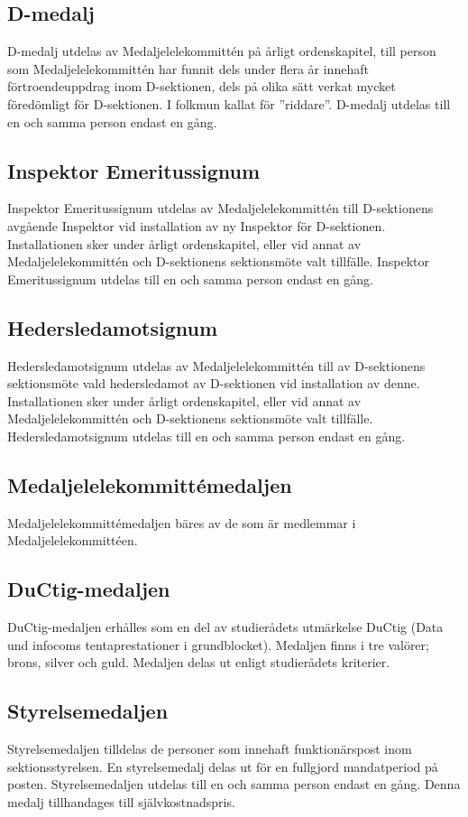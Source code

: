 \documentclass[pdfbookmarks,a4paper,11pt]{article}
\begin{document}
\subsection{D-medalj}
D-medalj utdelas av Medaljelelekommittén på årligt ordenskapitel, till person som Medaljelelekommittén har funnit dels under flera år innehaft förtroendeuppdrag inom D-sektionen, dels på olika sätt verkat mycket föredömligt för D-sektionen. I folkmun kallat för ''riddare''. D-medalj utdelas till en och samma person endast en gång.

\subsection{Inspektor Emeritussignum}
Inspektor Emeritussignum utdelas av Medaljelelekommittén till D-sektionens avgående Inspektor vid installation av ny Inspektor för D-sektionen. Installationen sker under årligt ordenskapitel, eller vid annat av Medaljelelekommittén och D-sektionens sektionsmöte valt tillfälle. Inspektor Emeritussignum utdelas till en och samma person endast en gång.

\subsection{Hedersledamotsignum}
Hedersledamotsignum utdelas av Medaljelelekommittén till av D-sektionens sektionsmöte vald hedersledamot av D-sektionen vid installation av denne. Installationen sker under årligt ordenskapitel, eller vid annat av Medaljelelekommittén och D-sektionens sektionsmöte valt tillfälle. Hedersledamotsignum utdelas till en och samma person endast en gång.

\subsection{Medaljelelekommittémedaljen}
Medaljelelekommittémedaljen bäres av de som är medlemmar i Medaljelelekommittéen.

\subsection{DuCtig-medaljen}
DuCtig-medaljen erhålles som en del av studierådets utmärkelse DuCtig (Data und infocoms tentaprestationer i grundblocket). Medaljen finns i tre valörer; brons, silver och guld. Medaljen delas ut enligt studierådets kriterier.

\subsection{Styrelsemedaljen}
Styrelsemedaljen tilldelas de personer som innehaft funktionärspost inom sektionsstyrelsen. En styrelsemedalj delas ut för en fullgjord mandatperiod på posten. Styrelsemedaljen utdelas till en och samma person endast en gång. Denna medalj tillhandages till självkostnadspris.
\end{document}
